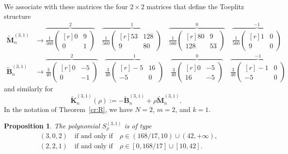 \documentclass[addpoints,12pt,letter]{article}
\newcommand{\nf}{\infty}
\newcommand{\SR}{S}
\numberwithin{equation}{section}
\newtheorem{proposition}[lemma]{Proposition}
\theoremstyle{definition}
\begin{document}
We associate with these matrices the four $2\times 2$ matrices that define the Toeplitz structure
\begin{align}\label{eq:422}
\widetilde{\mathbf{M}}_{n}^{(3,1)} &\to
\overbrace{\frac{1}{560}\begin{pmatrix}[r]
0 & 9
\\ 0 & 1
\end{pmatrix}}^{2}
\quad
\overbrace{\frac{1}{560}\begin{pmatrix}[r]
53 & 128
\\ 9 & 80
\end{pmatrix}}^{1}
\quad
\overbrace{\frac{1}{560}\begin{pmatrix}[r]
80 & 9
\\ 128 & 53
\end{pmatrix}}^{0}
\quad
\overbrace{\frac{1}{560}\begin{pmatrix}[r]
1 & 0
\\ 9 & 0
\end{pmatrix}}^{-1}
\\
\widetilde{\mathbf{B}}_{n}^{(3,1)} &\to
\overbrace{\frac{3}{40}\begin{pmatrix}[r]
0 &-5
\\ 0 &-1
\end{pmatrix}}^{2}
\quad
\overbrace{\frac{3}{40}\begin{pmatrix}[r]
-5 & 16
\\-5 & 0
\end{pmatrix}}^{1}
\quad
\overbrace{\frac{3}{40}\begin{pmatrix}[r]
0 &-5
\\ 16 &-5
\end{pmatrix}}^{0}
\quad
\overbrace{\frac{3}{40}\begin{pmatrix}[r]
-1 & 0
\\-5 & 0
\end{pmatrix}}^{-1}
\label{eq:423}
\end{align}
and similarly for
\begin{equation} \label{eq:new1}
    \widetilde{\mathbf{K}}_{n}^{(3,1)}(\rho):=-\widetilde{\mathbf{B}}_{n}^{(3,1)}+\rho\widetilde{\mathbf{M}}_{n}^{(3,1)}.
\end{equation}
In the notation of Theorem~\ref{cr:R}, we have $N=2$, $m=2$, and $k=1$.

\begin{proposition}\label{prop:43}
The polynomial $\SR_{\rho}^{(3,1)}$ is of type
\begin{align*}
&(3,0,2)\quad\text{if and only if}\quad\rho\in (168/17,10)\cup (42,+\nf),\\
&(2,2,1)\quad\text{if and only if}\quad\rho\in [0,168/17]\cup [10,42].
\end{align*}
\end{proposition}
\end{document}
